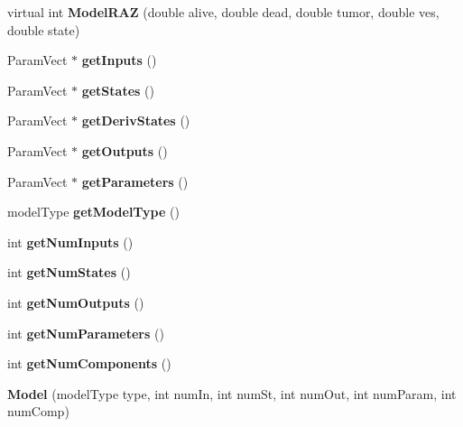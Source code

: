 \begin{DoxyCompactItemize}
\item 
virtual int {\bfseries Model\+R\+AZ} (double alive, double dead, double tumor, double ves, double state)\hypertarget{classModel_ae3babc024a4efc7435027bf7027e83f7}{}\label{classModel_ae3babc024a4efc7435027bf7027e83f7}

\item 
Param\+Vect $\ast$ {\bfseries get\+Inputs} ()\hypertarget{classModel_a1f620e02d5a86d46d0f457d1434ed7cb}{}\label{classModel_a1f620e02d5a86d46d0f457d1434ed7cb}

\item 
Param\+Vect $\ast$ {\bfseries get\+States} ()\hypertarget{classModel_a3549c6b8e6f2309b1fe4855608c7b982}{}\label{classModel_a3549c6b8e6f2309b1fe4855608c7b982}

\item 
Param\+Vect $\ast$ {\bfseries get\+Deriv\+States} ()\hypertarget{classModel_a44e626bc349c1e65c24ce428581fb6a0}{}\label{classModel_a44e626bc349c1e65c24ce428581fb6a0}

\item 
Param\+Vect $\ast$ {\bfseries get\+Outputs} ()\hypertarget{classModel_acd88c9afa0894aa3ef5423cfc366babb}{}\label{classModel_acd88c9afa0894aa3ef5423cfc366babb}

\item 
Param\+Vect $\ast$ {\bfseries get\+Parameters} ()\hypertarget{classModel_a80ccc79760b0ab3bfbcf39a8571eac69}{}\label{classModel_a80ccc79760b0ab3bfbcf39a8571eac69}

\item 
model\+Type {\bfseries get\+Model\+Type} ()\hypertarget{classModel_a24d1b194299124c3f65e4f20855d7104}{}\label{classModel_a24d1b194299124c3f65e4f20855d7104}

\item 
int {\bfseries get\+Num\+Inputs} ()\hypertarget{classModel_a7e5d25ef9db01179233b54faea3ad190}{}\label{classModel_a7e5d25ef9db01179233b54faea3ad190}

\item 
int {\bfseries get\+Num\+States} ()\hypertarget{classModel_a07d29a7bb225622ca88d559e8bdfe031}{}\label{classModel_a07d29a7bb225622ca88d559e8bdfe031}

\item 
int {\bfseries get\+Num\+Outputs} ()\hypertarget{classModel_a8c4523b58bc1edd5c905d1c7c8da4856}{}\label{classModel_a8c4523b58bc1edd5c905d1c7c8da4856}

\item 
int {\bfseries get\+Num\+Parameters} ()\hypertarget{classModel_a8739c95eafda946f6382ed158895be01}{}\label{classModel_a8739c95eafda946f6382ed158895be01}

\item 
int {\bfseries get\+Num\+Components} ()\hypertarget{classModel_ad42ac7f8c810754efbd8604036f63264}{}\label{classModel_ad42ac7f8c810754efbd8604036f63264}

\item 
{\bfseries Model} (model\+Type type, int num\+In, int num\+St, int num\+Out, int num\+Param, int num\+Comp)\hypertarget{classModel_a933ee1ac67b14821e764c85b419c0b9e}{}\label{classModel_a933ee1ac67b14821e764c85b419c0b9e}

\end{DoxyCompactItemize}
